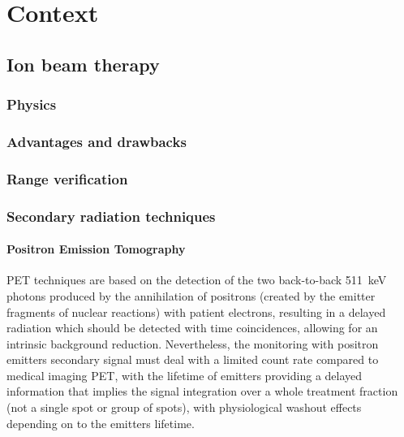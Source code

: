 \chapter{Context}\label{chap::1}

\vfill

\minitoc

\newpage


\glsresetall

\section{Ion beam therapy}

\subsection{Physics}

\subsection{Advantages and drawbacks}

\subsection{Range verification}

\subsection{Secondary radiation techniques}

\subsubsection{Positron Emission Tomography}
PET techniques are based on the detection of the two back-to-back 511~keV photons produced by the annihilation of positrons (created by the emitter fragments of nuclear reactions) with patient electrons, resulting in a delayed radiation which should be detected with time coincidences, allowing for an intrinsic background reduction. Nevertheless, the monitoring with positron emitters secondary signal must deal with a limited count rate compared to medical imaging PET, with the lifetime of emitters providing a delayed information that implies the signal integration over a whole treatment fraction (not a single spot or group of spots), with physiological washout effects depending on to the emitters lifetime.

